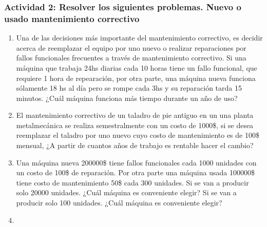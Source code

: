 \documentclass[a4paper]{article}
\begin{document}
\subsubsection{Actividad 2: Resolver los siguientes problemas. Nuevo o usado mantenimiento correctivo}
\begin{enumerate}
\item Una de las decisiones más importante del mantenimiento correctivo,
 es decidir acerca de reemplazar el equipo por uno nuevo o realizar 
 reparaciones por fallos funcionales frecuentes a través de mantenimiento 
 correctivo. Si una máquina que trabaja 24hs diarias cada 10 horas tiene
un fallo funcional, que requiere 1 hora de repearación, por otra parte,
una máquina nueva funciona sólamente 18 hs al día pero se rompe cada 3hs
 y su reparación tarda 15 minutos. ¿Cuál máquina funciona más tiempo durante un año de uso?
\item El mantenimiento correctivo de un taladro de pie antiguo en un una planta metalmecánica 
se realiza semestralmente con un costo de 1000\$, si se desea reemplazar el taladro por uno nuevo 
cuyo costo de mantenimiento es de 100\$ mensual, ¿A partir de cuantos años de trabajo es rentable hacer el cambio? 
\item Una máquina nueva 200000\$ tiene fallos funcionales cada 1000 unidades con un costo de 100\$ de reparación. 
Por otra parte una máquina usada 100000\$ tiene costo de mantenimiento 50\$ cada 300 unidades.
Si se van a producir solo 20000 unidades. ¿Cuál máquina es conveniente elegir?
Si se van a producir solo 100 unidades. ¿Cuál máquina es conveniente elegir?
\item 

\end{enumerate}
\end{document}
